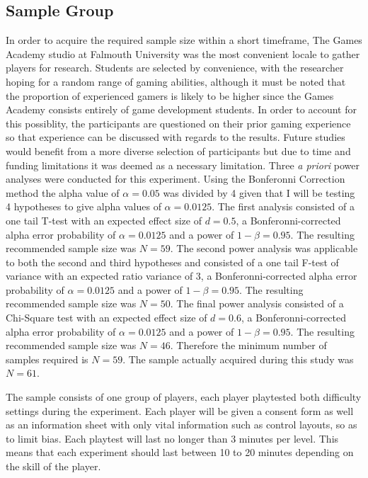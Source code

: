 \documentclass[journal]{IEEEtran}
\begin{document}
\subsection{Sample Group}
In order to acquire the required sample size within a short timeframe, The Games Academy studio at Falmouth University was the most convenient locale to gather players for research. Students are selected by convenience, with the researcher hoping for a random range of gaming abilities, although it must be noted that the proportion of experienced gamers is likely to be higher since the Games Academy consists entirely of game development students. In order to account for this possiblity, the participants are questioned on their prior gaming experience so that experience can be discussed with regards to the results. Future studies would benefit from a more diverse selection of participants but due to time and funding limitations it was deemed as a necessary limitation. Three \textit{a priori} power analyses were conducted for this experiment. Using the Bonferonni Correction \cite{weisstein2004bonferroni} method the alpha value of $\alpha = 0.05$ was divided by 4 given that I will be testing 4 hypotheses to give alpha values of $\alpha = 0.0125$. The first analysis consisted of a one tail T-test with an expected effect size of $d = 0.5$, a Bonferonni-corrected alpha error probability of $\alpha = 0.0125$ and a power of $1 - \beta = 0.95$. The resulting recommended sample size was $N = 59$. 
The second power analysis was applicable to both the second and third hypotheses and consisted of a one tail F-test of variance with an expected ratio variance of 3, a Bonferonni-corrected  alpha error probability of $\alpha = 0.0125$ and a power of $1 - \beta = 0.95$. The resulting recommended sample size was $N = 50$.
The final power analysis consisted of a Chi-Square test with an expected effect size of $d = 0.6$, a Bonferonni-corrected alpha error probability of $\alpha = 0.0125$ and a power of $1 - \beta = 0.95$. The resulting recommended sample size was $N = 46$. Therefore the minimum number of samples required is $N = 59$. The sample actually acquired during this study was $N = 61$. 

The sample consists of one group of players, each player playtested both difficulty settings during the experiment. Each player will be given a consent form as well as an information sheet with only vital information such as control layouts, so as to limit bias. Each playtest will last no longer than 3 minutes per level. This means that each experiment should last between 10 to 20 minutes depending on the skill of the player.
\end{document}
